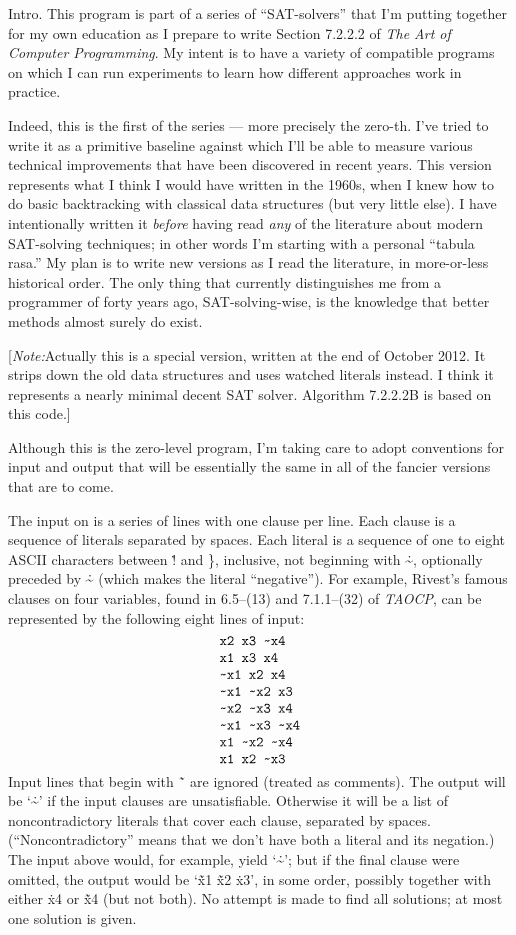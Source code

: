 
\datethis

Intro. This program is part of a series of ``SAT-solvers'' that I'm
putting
together for my own education as I prepare to write Section 7.2.2.2 of
{\sl The Art of Computer Programming}. My intent is to have a variety of
compatible programs on which I can run experiments to learn how different
approaches work in practice.

Indeed, this is the first of the series --- more precisely the zero-th. I've
tried to write it as a primitive baseline against which I'll be able to measure
various technical improvements that have been discovered in recent years.
This version represents what I think I would have written in the 1960s,
when I knew how to do basic backtracking with classical data structures
(but very little else). I have intentionally written it {\it before\/} having
read {\it any\/} of the literature about modern SAT-solving techniques;
in other words I'm starting with a personal ``tabula rasa.''
My plan is to write new versions as I read the literature, in more-or-less
historical order. The only thing that currently distinguishes me from a
programmer of forty years ago, SAT-solving-wise, is the knowledge that better
methods almost surely do exist.

[{\it Note:}\enspace Actually this is a special version, written
at the end of October 2012. It strips down the old data structures
and uses watched literals instead. I think it represents a nearly
minimal decent {\mc SAT} solver. Algorithm 7.2.2.2B is based on this code.]

Although this is the zero-level program, I'm taking care to adopt conventions
for input and output that will be essentially the same in all of the
fancier versions that are to come.

The input on  is a series of lines with one clause per line. Each
clause is a sequence of literals separated by spaces. Each literal is
a sequence of one to eight ASCII characters between \.{!} and \.{\}},
inclusive, not beginning with \.{\~},
optionally preceded by \.{\~} (which makes the literal ``negative'').
For example, Rivest's famous clauses on four variables,
found in 6.5--(13) and 7.1.1--(32) of {\sl TAOCP}, can be represented by the
following eight lines of input:
$$\chardef~=`\~
\vcenter{\halign{\tt#\cr
x2 x3 ~x4\cr
x1 x3 x4\cr
~x1 x2 x4\cr
~x1 ~x2 x3\cr
~x2 ~x3 x4\cr
~x1 ~x3 ~x4\cr
x1 ~x2 ~x4\cr
x1 x2 ~x3\cr}}$$
Input lines that begin with \.{\~\ } are ignored (treated as comments).
The output will be `\.{\~}' if the input clauses are unsatisfiable.
Otherwise it will be a list of noncontradictory literals that cover each
clause, separated by spaces. (``Noncontradictory'' means that we don't
have both a literal and its negation.) The input above would, for example,
yield `\.{\~}'; but if the final clause were omitted, the output would
be `\.{\~x1} \.{\~x2} \.{x3}', in some order, possibly together
with either \.{x4} or \.{\~x4} (but not both). No attempt is made to
find all solutions; at most one solution is given.

